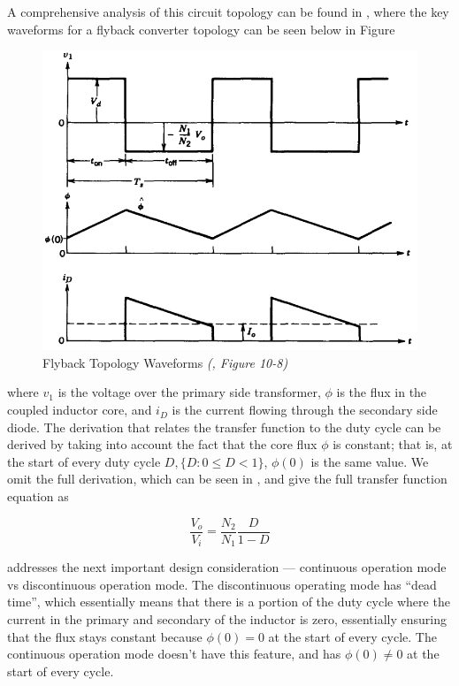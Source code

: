 \documentclass[a4paper, 12pt]{article}
\begin{document}
A comprehensive analysis of this circuit topology can be found in
\cite{pwe_conv_applications}, where the key waveforms for a flyback converter
topology can be seen below in Figure

\begin{figure}[H]
	\centering
	\includegraphics[width=.8\textwidth]{./images/pwe_text_flyback_waveforms.png}
	\caption{Flyback Topology Waveforms \textit{(\cite{pwe_conv_applications}, Figure 10-8)}}
	\label{fig:pwe_text_waveforms}
\end{figure}

where $v_1$ is the voltage over the primary side transformer, $\phi$ is the
flux in the coupled inductor core, and $i_D$ is the current flowing through the
secondary side diode. The derivation that relates the transfer function to the
duty cycle can be derived by taking into account the fact that the core flux
$\phi$ is constant; that is, at the start of every duty cycle $D, \{D: 0 \le D <
1\}$, $\phi(0)$ is the same value. We omit the full derivation, which can be
seen in \cite{pwe_conv_applications}, and give the full transfer function
equation as

\begin{equation}
	\frac{V_o}{V_i} = \frac{N_2}{N_1}\frac{D}{1 - D}
	\label{eq:lit_review_tf}
\end{equation}

\cite{pressman} addresses the next important design consideration ---
continuous operation mode vs discontinuous operation mode. The discontinuous
operating mode has ``dead time'', which essentially means that there is a
portion of the duty cycle where the current in the primary and secondary of the
inductor is zero, essentially ensuring that the flux stays constant because
$\phi(0) = 0$ at the start of every cycle. The continuous operation mode
doesn't have this feature, and has $\phi(0) \not = 0$ at the start of every
cycle.
\end{document}
